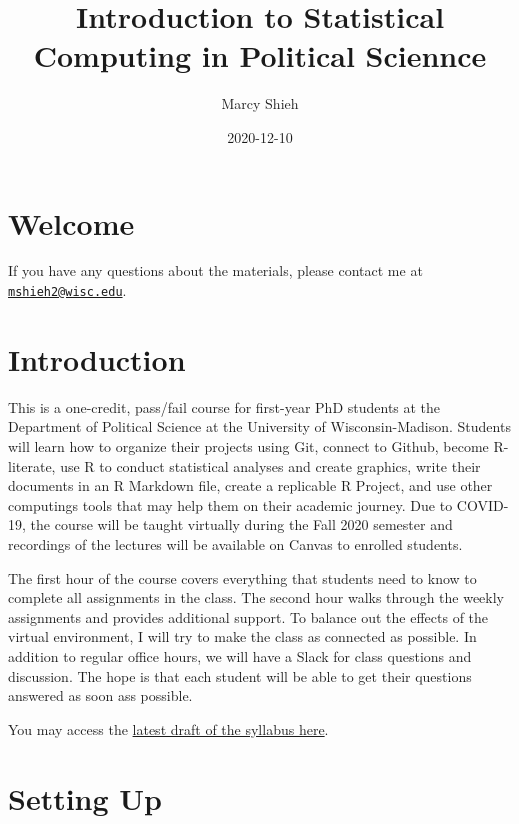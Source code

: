 \documentclass[
]{book}
\title{Introduction to Statistical Computing in Political Sciennce}
\author{Marcy Shieh}
\date{2020-12-10}
\begin{document}
\maketitle

{
\setcounter{tocdepth}{1}
\tableofcontents
}
\hypertarget{welcome}{%
\chapter{Welcome}\label{welcome}}

If you have any questions about the materials, please contact me at \href{mailto:mshieh2@wisc.edu}{\nolinkurl{mshieh2@wisc.edu}}.

\hypertarget{intro}{%
\chapter{Introduction}\label{intro}}

This is a one-credit, pass/fail course for first-year PhD students at the Department of Political Science at the University of Wisconsin-Madison. Students will learn how to organize their projects using Git, connect to Github, become R-literate, use R to conduct statistical analyses and create graphics, write their documents in an R Markdown file, create a replicable R Project, and use other computings tools that may help them on their academic journey. Due to COVID-19, the course will be taught virtually during the Fall 2020 semester and recordings of the lectures will be available on Canvas to enrolled students.

The first hour of the course covers everything that students need to know to complete all assignments in the class. The second hour walks through the weekly assignments and provides additional support. To balance out the effects of the virtual environment, I will try to make the class as connected as possible. In addition to regular office hours, we will have a Slack for class questions and discussion. The hope is that each student will be able to get their questions answered as soon ass possible.

You may access the \href{https://github.com/marcyshieh/ps811/blob/master/syllabus/ps811_fall2020_syllabus.pdf}{latest draft of the syllabus here}.

\hypertarget{setting-up}{%
\chapter{Setting Up}\label{setting-up}}
\end{document}
